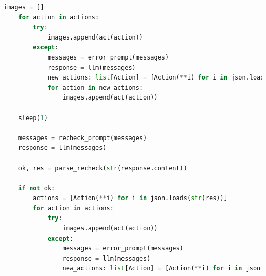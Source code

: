 \documentclass[UTF8, fontset=windows]{article}
\begin{document}
\begin{lstlisting}[language=Python]
    images = []
    for action in actions:
        try:
            images.append(act(action))
        except:
            messages = error_prompt(messages)
            response = llm(messages)
            new_actions: list[Action] = [Action(**i) for i in json.loads(str(response.content))]
            for action in new_actions:
                images.append(act(action))
        
    sleep(1)
        
    messages = recheck_prompt(messages)
    response = llm(messages)
    
    ok, res = parse_recheck(str(response.content))
    
    if not ok:
        actions = [Action(**i) for i in json.loads(str(res))]
        for action in actions:
            try:
                images.append(act(action))
            except:
                messages = error_prompt(messages)
                response = llm(messages)
                new_actions: list[Action] = [Action(**i) for i in json.loads(str(response.content))]
\end{lstlisting}
\end{document}
